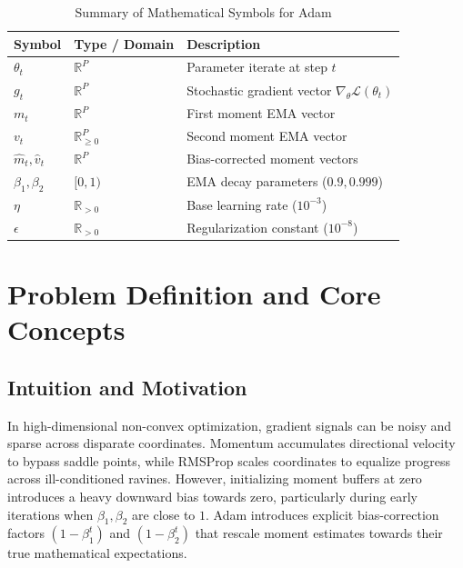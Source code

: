 \documentclass[11pt,a4paper]{article}
\theoremstyle{definition}
\begin{document}
\begin{table}[h]
\centering
\caption{Summary of Mathematical Symbols for Adam}
\begin{tabular}{lll}
\toprule
\textbf{Symbol} & \textbf{Type / Domain} & \textbf{Description} \\
\midrule
$\theta_t$ & $\mathbb{R}^P$ & Parameter iterate at step $t$ \\
$g_t$ & $\mathbb{R}^P$ & Stochastic gradient vector $\nabla_\theta \mathcal{L}(\theta_t)$ \\
$m_t$ & $\mathbb{R}^P$ & First moment EMA vector \\
$v_t$ & $\mathbb{R}^P_{\ge 0}$ & Second moment EMA vector \\
$\hat{m}_t, \hat{v}_t$ & $\mathbb{R}^P$ & Bias-corrected moment vectors \\
$\beta_1, \beta_2$ & $[0, 1)$ & EMA decay parameters ($0.9, 0.999$) \\
$\eta$ & $\mathbb{R}_{>0}$ & Base learning rate ($10^{-3}$) \\
$\epsilon$ & $\mathbb{R}_{>0}$ & Regularization constant ($10^{-8}$) \\
\bottomrule
\end{tabular}
\end{table}

\section{Problem Definition and Core Concepts}

\subsection{Intuition and Motivation}
In high-dimensional non-convex optimization, gradient signals can be noisy and sparse across disparate coordinates. Momentum accumulates directional velocity to bypass saddle points, while RMSProp scales coordinates to equalize progress across ill-conditioned ravines. However, initializing moment buffers at zero introduces a heavy downward bias towards zero, particularly during early iterations when $\beta_1, \beta_2$ are close to $1$. Adam introduces explicit bias-correction factors $(1 - \beta_1^t)$ and $(1 - \beta_2^t)$ that rescale moment estimates towards their true mathematical expectations.
\end{document}
